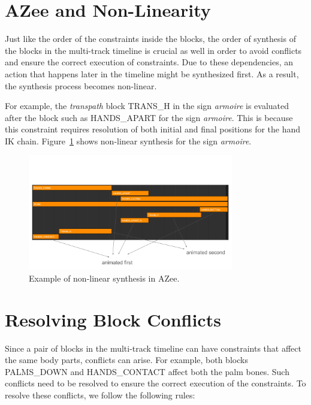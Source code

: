 \documentclass[../../main.tex]{subfiles}
\begin{document}
\section{AZee and Non-Linearity}
\label{ch:multi_track:azee_nl}

Just like the order of the constraints inside the blocks, the order of synthesis of the blocks in the multi-track timeline is crucial as well in order to avoid conflicts and ensure the correct execution of constraints. Due to these dependencies, an action that happens later in the timeline might be synthesized first. As a result, the synthesis process becomes non-linear.

For example, the \emph{transpath} block TRANS\_H in the sign \emph{armoire} is evaluated after the block such as HANDS\_APART for the sign \emph{armoire}. This is because this constraint requires resolution of both initial and final positions for the hand IK chain. Figure~\ref{fig:example_azee_non_linear} shows non-linear synthesis for the sign \emph{armoire}.

\begin{figure}[h]
    \centering
    \includegraphics[width=0.8\textwidth]{chapters/multi_track/images/example_azee_non_linear.png}
    \caption{Example of non-linear synthesis in AZee.}
    \label{fig:example_azee_non_linear}
\end{figure}

\section{Resolving Block Conflicts}
\label{ch:multi_track:resolve_conflicts}

Since a pair of blocks in the multi-track timeline can have constraints that affect the same body parts, conflicts can arise. For example, both blocks PALMS\_DOWN and HANDS\_CONTACT affect both the palm bones. Such conflicts need to be resolved to ensure the correct execution of the constraints. To resolve these conflicts, we follow the following rules:
\end{document}
